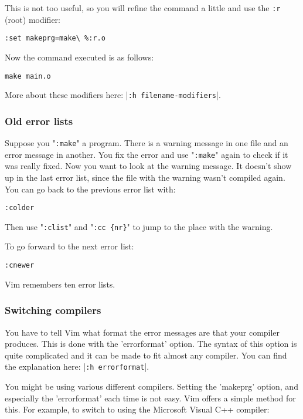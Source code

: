 This is not too useful, so you will refine the command a little and use the \verb!:r! (root) modifier:

\begin{Verbatim}[samepage=true]
 :set makeprg=make\ %:r.o
\end{Verbatim}

Now the command executed is as follows:

\begin{Verbatim}[samepage=true]
 make main.o
\end{Verbatim}

More about these modifiers here: |\verb!:h filename-modifiers!|.
\subsubsection{Old error lists}
Suppose you "\verb!:make!" a program.
There is a warning message in one file and an error message in another.
You fix the error and use "\verb!:make!" again to check if it was really fixed.
Now you want to look at the warning message.
It doesn't show up in the last error list, since the file with the warning wasn't compiled again.
You can go back to the previous error list with:

\begin{Verbatim}[samepage=true]
 :colder
\end{Verbatim}

Then use "\verb!:clist!" and "\verb!:cc {nr}!" to jump to the place with the warning.

To go forward to the next error list:

\begin{Verbatim}[samepage=true]
 :cnewer
\end{Verbatim}

Vim remembers ten error lists.
\subsubsection{Switching compilers}
You have to tell Vim what format the error messages are that your compiler produces.
This is done with the 'errorformat' option.
The syntax of this option is quite complicated and it can be made to fit almost any compiler.
You can find the explanation here: |\verb!:h errorformat!|.

You might be using various different compilers.
Setting the 'makeprg' option, and especially the 'errorformat' each time is not easy.
Vim offers a simple method for this.
For example, to switch to using the Microsoft Visual C++ compiler:

